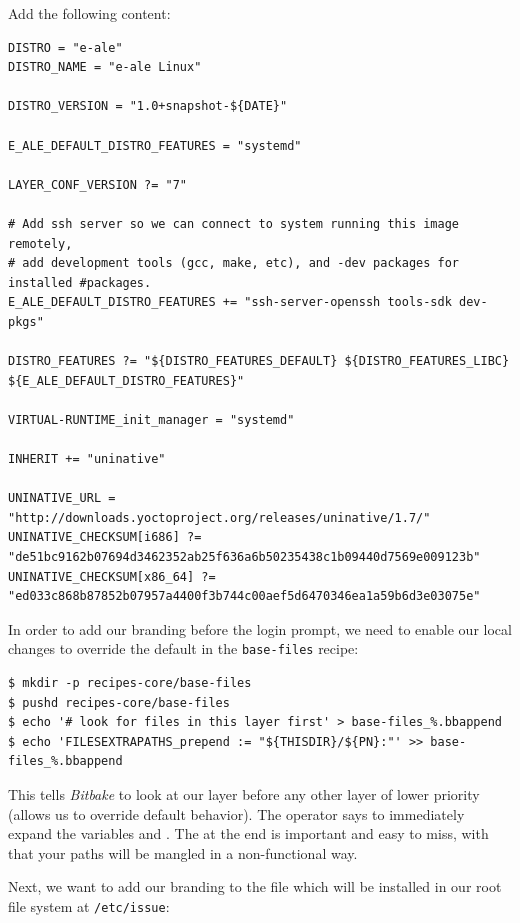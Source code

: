 \documentclass[a4paper,12pt,obeyspaces,spaces,hyphens]{article}
\newcommand{\code}[1]
{\path{#1}}
\begin{document}
Add the following content:
\begin{tcolorbox}[enhanced jigsaw,colback=bg,boxrule=0pt,arc=0pt]
\begin{verbatim}
DISTRO = "e-ale"
DISTRO_NAME = "e-ale Linux"

DISTRO_VERSION = "1.0+snapshot-${DATE}"

E_ALE_DEFAULT_DISTRO_FEATURES = "systemd"

LAYER_CONF_VERSION ?= "7"

# Add ssh server so we can connect to system running this image remotely,
# add development tools (gcc, make, etc), and -dev packages for installed #packages.
E_ALE_DEFAULT_DISTRO_FEATURES += "ssh-server-openssh tools-sdk dev-pkgs"

DISTRO_FEATURES ?= "${DISTRO_FEATURES_DEFAULT} ${DISTRO_FEATURES_LIBC} ${E_ALE_DEFAULT_DISTRO_FEATURES}"

VIRTUAL-RUNTIME_init_manager = "systemd"

INHERIT += "uninative"

UNINATIVE_URL = "http://downloads.yoctoproject.org/releases/uninative/1.7/"
UNINATIVE_CHECKSUM[i686] ?= "de51bc9162b07694d3462352ab25f636a6b50235438c1b09440d7569e009123b"
UNINATIVE_CHECKSUM[x86_64] ?= "ed033c868b87852b07957a4400f3b744c00aef5d6470346ea1a59b6d3e03075e"
\end{verbatim}
\end{tcolorbox}

In order to add our branding before the login prompt, we need to enable our local changes to override the default in the \texttt{base-files} recipe:

\begin{verbatim}
$ mkdir -p recipes-core/base-files
$ pushd recipes-core/base-files
$ echo '# look for files in this layer first' > base-files_%.bbappend
$ echo 'FILESEXTRAPATHS_prepend := "${THISDIR}/${PN}:"' >> base-files_%.bbappend
\end{verbatim}

This tells {\em Bitbake} to look at our \code{meta-e-ale-distro} layer before any other layer of lower priority (allows us to override default behavior). The \code{:=} operator says to immediately expand the variables \code{${THISDIR}} and \code{${PN}}. The \code{:} at the end is important and easy to miss, with that your paths will be mangled in a non-functional way.

Next, we want to add our branding to the file which will be installed in our root file system at \texttt{/etc/issue}:
\end{document}
